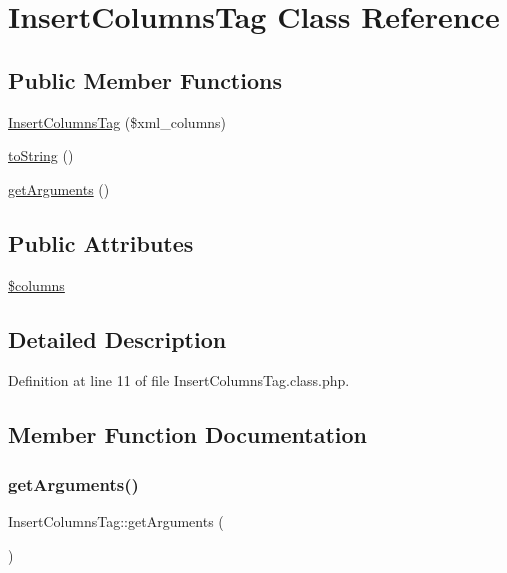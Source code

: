 \hypertarget{classInsertColumnsTag}{}\section{Insert\+Columns\+Tag Class Reference}
\label{classInsertColumnsTag}
\subsection*{Public Member Functions}
\begin{DoxyCompactItemize}
\item 
\hyperlink{classInsertColumnsTag_a4d414adeb3714b646e7a55fc6b446c2c}{Insert\+Columns\+Tag} (\$xml\+\_\+columns)
\item 
\hyperlink{classInsertColumnsTag_aa18eef08112bb20ab2d77b26270e40ea}{to\+String} ()
\item 
\hyperlink{classInsertColumnsTag_ae6cb8af5c32b1c3dbb727a4322767536}{get\+Arguments} ()
\end{DoxyCompactItemize}
\subsection*{Public Attributes}
\begin{DoxyCompactItemize}
\item 
\hyperlink{classInsertColumnsTag_a430ddaff2f1eeced25e580a8e714f2e4}{\$columns}
\end{DoxyCompactItemize}


\subsection{Detailed Description}


Definition at line 11 of file Insert\+Columns\+Tag.\+class.\+php.



\subsection{Member Function Documentation}
\hypertarget{classInsertColumnsTag_ae6cb8af5c32b1c3dbb727a4322767536}{}\label{classInsertColumnsTag_ae6cb8af5c32b1c3dbb727a4322767536} 
\subsubsection{\texorpdfstring{get\+Arguments()}{getArguments()}}
{\footnotesize\ttfamily Insert\+Columns\+Tag\+::get\+Arguments (\begin{DoxyParamCaption}{ }\end{DoxyParamCaption})}

